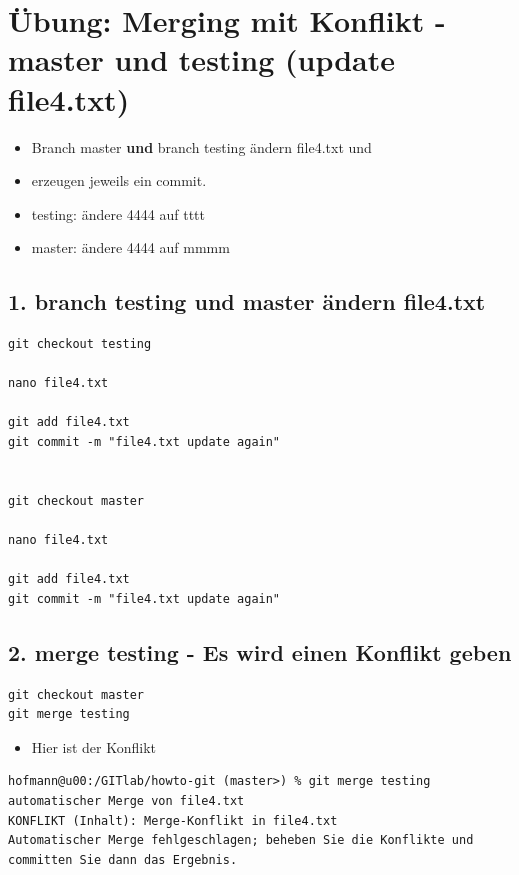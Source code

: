 \documentclass[11pt]{article}
\begin{document}
\section{Übung: Merging mit Konflikt - master und testing (update file4.txt)}
\label{sec:org8a09aba}

\begin{itemize}
\item Branch master \textbf{und} branch testing ändern file4.txt und
\item erzeugen jeweils ein commit.
\item testing: ändere 4444 auf tttt
\item master: ändere 4444 auf mmmm
\end{itemize}

\subsection{1. branch testing und master ändern file4.txt}
\label{sec:org9c32f19}
\begin{verbatim}
git checkout testing

nano file4.txt    

git add file4.txt
git commit -m "file4.txt update again"


git checkout master

nano file4.txt

git add file4.txt
git commit -m "file4.txt update again"

\end{verbatim}


\subsection{2. merge testing - Es wird einen Konflikt geben}
\label{sec:orge78de38}

\begin{verbatim}
git checkout master
git merge testing
\end{verbatim}

\begin{itemize}
\item Hier ist der Konflikt
\end{itemize}

\begin{verbatim}
hofmann@u00:/GITlab/howto-git (master>) % git merge testing
automatischer Merge von file4.txt
KONFLIKT (Inhalt): Merge-Konflikt in file4.txt
Automatischer Merge fehlgeschlagen; beheben Sie die Konflikte und committen Sie dann das Ergebnis.
\end{verbatim}
\end{document}
